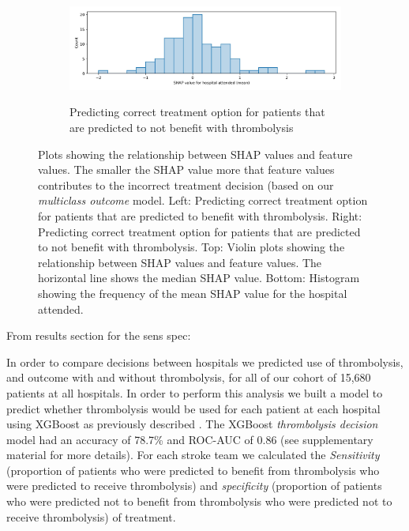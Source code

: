\begin{figure}
\begin{subfigure}{.5\textwidth}
      \label{fig:shap_matching_treatment_should}
    \end{subfigure}%
    \begin{subfigure}{.5\textwidth}
      \centering
      \captionsetup{width=.9\linewidth}
      \includegraphics[trim={0 0 0 0.1cm}, clip, width=1\linewidth]
{./images/210_xgb_all_data_multiclass_outcome_999999_hosp_shap_hist_should not}\\
      \caption{Predicting correct treatment option for patients that are predicted to not benefit with thrombolysis}
      \label{fig:shap_matching_treatment_should_not}
    \end{subfigure}
  \caption{Plots showing the relationship between SHAP values and feature values. The smaller the SHAP value more that feature values contributes to the incorrect treatment decision (based on our \textit{multiclass outcome} model. Left: Predicting correct treatment option for patients that are predicted to benefit with thrombolysis. Right: Predicting correct treatment option for patients that are predicted to not benefit with thrombolysis. Top: Violin plots showing the relationship between SHAP values and feature values. The horizontal line shows the median SHAP value. Bottom: Histogram showing the frequency of the mean SHAP value for the hospital attended.}
  \label{fig:shap_matching_treatment}
\end{figure}
\fi

From results section for the sens spec:

In order to compare decisions between hospitals we predicted use of thrombolysis, and outcome with and without thrombolysis, for all of our cohort of 15,680 patients at all hospitals. In order to perform this analysis we built a model to predict whether thrombolysis would be used for each patient at each hospital using XGBoost as previously described \cite{pearn_what_2023}. The XGBoost \textit{thrombolysis decision} model had an accuracy of 78.7\% and ROC-AUC of 0.86 (see supplementary material for more details). For each stroke team we calculated the \textit{Sensitivity} (proportion of patients who were predicted to benefit from thrombolysis who were predicted to receive thrombolysis) and \textit{specificity} (proportion of patients who were predicted not to benefit from thrombolysis who were predicted not to receive thrombolysis) of treatment. 
